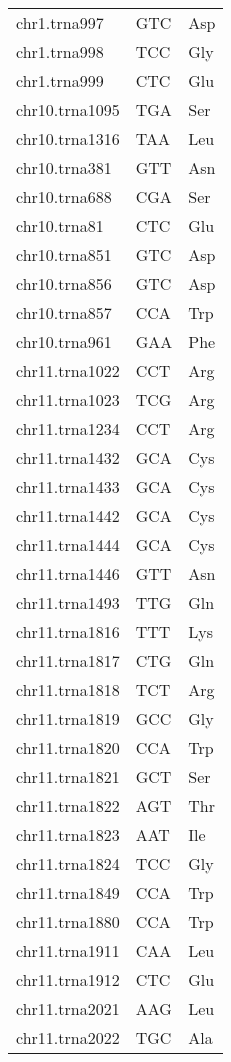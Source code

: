 \begin{longtable}{@{}l>{\collectcell\anticodon}l<{\endcollectcell}l@{}}
    chr1.trna997 & GTC & Asp \\
    chr1.trna998 & TCC & Gly \\
    chr1.trna999 & CTC & Glu \\
    chr10.trna1095 & TGA & Ser \\
    chr10.trna1316 & TAA & Leu \\
    chr10.trna381 & GTT & Asn \\
    chr10.trna688 & CGA & Ser \\
    chr10.trna81 & CTC & Glu \\
    chr10.trna851 & GTC & Asp \\
    chr10.trna856 & GTC & Asp \\
    chr10.trna857 & CCA & Trp \\
    chr10.trna961 & GAA & Phe \\
    chr11.trna1022 & CCT & Arg \\
    chr11.trna1023 & TCG & Arg \\
    chr11.trna1234 & CCT & Arg \\
    chr11.trna1432 & GCA & Cys \\
    chr11.trna1433 & GCA & Cys \\
    chr11.trna1442 & GCA & Cys \\
    chr11.trna1444 & GCA & Cys \\
    chr11.trna1446 & GTT & Asn \\
    chr11.trna1493 & TTG & Gln \\
    chr11.trna1816 & TTT & Lys \\
    chr11.trna1817 & CTG & Gln \\
    chr11.trna1818 & TCT & Arg \\
    chr11.trna1819 & GCC & Gly \\
    chr11.trna1820 & CCA & Trp \\
    chr11.trna1821 & GCT & Ser \\
    chr11.trna1822 & AGT & Thr \\
    chr11.trna1823 & AAT & Ile \\
    chr11.trna1824 & TCC & Gly \\
    chr11.trna1849 & CCA & Trp \\
    chr11.trna1880 & CCA & Trp \\
    chr11.trna1911 & CAA & Leu \\
    chr11.trna1912 & CTC & Glu \\
    chr11.trna2021 & AAG & Leu \\
    chr11.trna2022 & TGC & Ala \\

\end{longtable}
